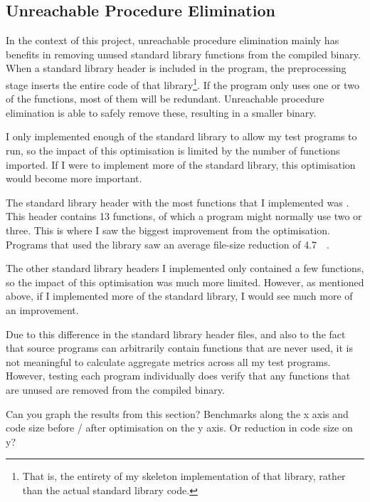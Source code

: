 \documentclass[00-main.tex]{subfiles}
\begin{document}
\subsection{Unreachable Procedure Elimination}

In the context of this project, unreachable procedure elimination mainly has benefits in removing unused standard library functions from the compiled binary.
When a standard library header is included in the program, the preprocessing stage inserts the entire code of that library\footnote{That is, the entirety of my skeleton implementation of that library, rather than the actual standard library code.}.
If the program only uses one or two of the functions, most of them will be redundant.
Unreachable procedure elimination is able to safely remove these, resulting in a smaller binary.

I only implemented enough of the standard library to allow my test programs to run, so the impact of this optimisation is limited by the number of functions imported.
If I were to implement more of the standard library, this optimisation would become more important.

The standard library header with the most functions that I implemented was .
This header contains 13 functions, of which a program might normally use two or three.
This is where I saw the biggest improvement from the optimisation.
Programs that used the  library saw an average file-size reduction of \SI{4.7}{\kilo\byte}.

The other standard library headers I implemented only contained a few functions, so the impact of this optimisation was much more limited. However, as mentioned above, if I implemented more of the standard library, I would see much more of an improvement.

Due to this difference in the standard library header files, and also to the fact that source programs can arbitrarily contain functions that are never used, it is not meaningful to calculate aggregate metrics across all my test programs.
However, testing each program individually does verify that any functions that are unused are removed from the compiled binary.

\begin{Comment}
Can you graph the results from this section?  Benchmarks along the x
axis and code size before / after optimisation on the y axis.  Or
reduction in code size on y?
\end{Comment}
\end{document}
